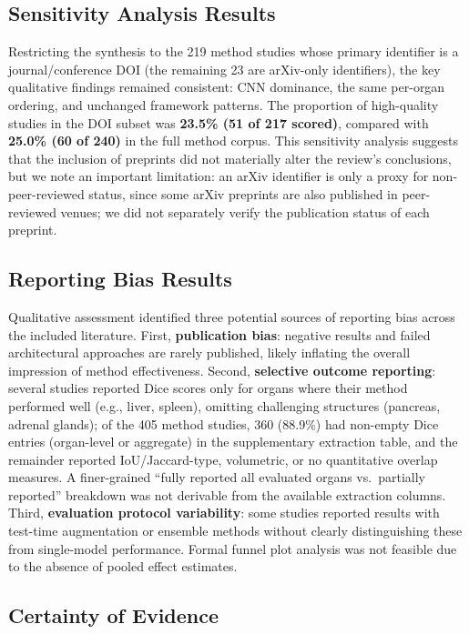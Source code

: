 \subsection{Sensitivity Analysis Results}

Restricting the synthesis to the 219 method studies whose primary identifier is a journal/conference DOI (the remaining 23 are arXiv-only identifiers), the key qualitative findings remained consistent: CNN dominance, the same per-organ ordering, and unchanged framework patterns. The proportion of high-quality studies in the DOI subset was \textbf{23.5\% (51 of 217 scored)}, compared with \textbf{25.0\% (60 of 240)} in the full method corpus. This sensitivity analysis suggests that the inclusion of preprints did not materially alter the review's conclusions, but we note an important limitation: an arXiv identifier is only a proxy for non-peer-reviewed status, since some arXiv preprints are also published in peer-reviewed venues; we did not separately verify the publication status of each preprint.

\subsection{Reporting Bias Results}

Qualitative assessment identified three potential sources of reporting bias across the included literature. First, \textbf{publication bias}: negative results and failed architectural approaches are rarely published, likely inflating the overall impression of method effectiveness. Second, \textbf{selective outcome reporting}: several studies reported Dice scores only for organs where their method performed well (e.g., liver, spleen), omitting challenging structures (pancreas, adrenal glands); of the 405 method studies, 360 (88.9\%) had non-empty Dice entries (organ-level or aggregate) in the supplementary extraction table, and the remainder reported IoU/Jaccard-type, volumetric, or no quantitative overlap measures. A finer-grained ``fully reported all evaluated organs vs.\ partially reported'' breakdown was not derivable from the available extraction columns. Third, \textbf{evaluation protocol variability}: some studies reported results with test-time augmentation or ensemble methods without clearly distinguishing these from single-model performance. Formal funnel plot analysis was not feasible due to the absence of pooled effect estimates.

\subsection{Certainty of Evidence}

